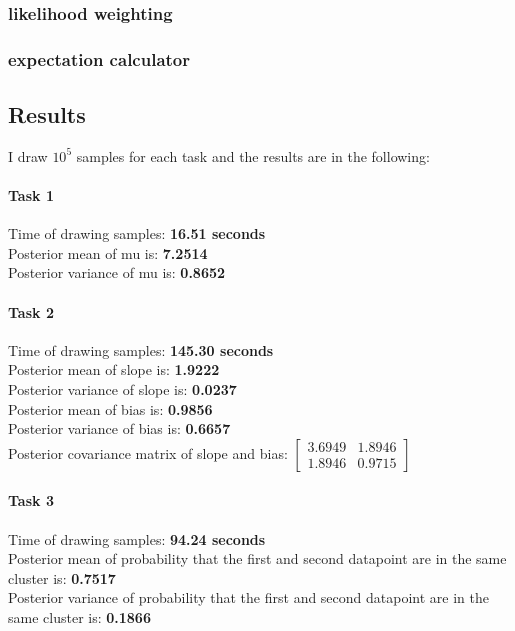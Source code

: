 \documentclass{article}
\begin{document}
\subsubsection{likelihood weighting}

\subsubsection{expectation calculator}

\subsection{Results}

I draw $10^5$ samples for each task and the results are in the following:
\paragraph{Task 1}
Time of drawing samples: \textbf{16.51 seconds}\\
Posterior mean of mu is: \textbf{7.2514}\\
Posterior variance of mu is: \textbf{0.8652}
\paragraph{Task 2}
Time of drawing samples: \textbf{145.30 seconds}\\
Posterior mean of slope is: \textbf{1.9222}\\
Posterior variance of slope is: \textbf{0.0237}\\
Posterior mean of bias is: \textbf{0.9856}\\
Posterior variance of bias is: \textbf{0.6657}\\
Posterior covariance matrix of slope and bias:
$
\begin{bmatrix}
3.6949 & 1.8946\\
1.8946 & 0.9715
\end{bmatrix}
$
\paragraph{Task 3}
Time of drawing samples: \textbf{94.24 seconds}\\
Posterior mean of probability that the first and second datapoint are in the same cluster is: \textbf{0.7517}\\
Posterior variance of probability that the first and second datapoint are in the same cluster is: \textbf{0.1866}
\end{document}
